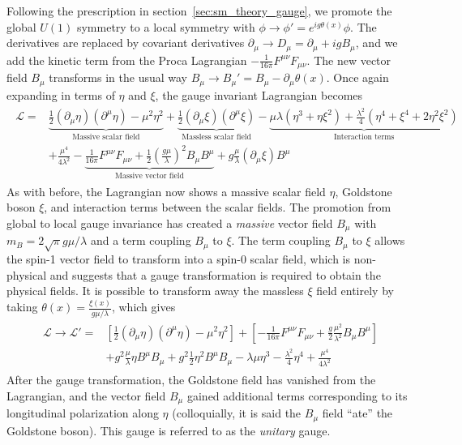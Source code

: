 Following the prescription in section~\ref{sec:sm_theory_gauge}, we promote the global $U(1)$ symmetry to a local symmetry with $\phi\to\phi'=e^{ig\theta(x)}\phi$. The derivatives are replaced by covariant derivatives $\partial_\mu\to D_\mu=\partial_\mu+igB_\mu$, and we add the kinetic term from the Proca Lagrangian $-\frac{1}{16\pi}F^{\mu\nu}F_{\mu\nu}$. The new vector field $B_\mu$ transforms in the usual way $B_\mu\to B_\mu'=B_\mu-\partial_\mu\theta(x)$. Once again expanding in terms of $\eta$ and $\xi$, the gauge invariant Lagrangian becomes
\begin{align}
	\begin{split}
	\mathcal{L}=&\underbrace{\frac{1}{2}(\partial_\mu\eta)(\partial^\mu\eta)-\mu^2\eta^2}_\text{Massive scalar field}+\underbrace{\frac{1}{2}(\partial_\mu\xi)(\partial^\mu\xi)}_\text{Massless scalar field}-\underbrace{\mu\lambda(\eta^3+\eta\xi^2)+\frac{\lambda^2}{4}(\eta^4+\xi^4+2\eta^2\xi^2)}_\text{Interaction terms}\\
	&+\frac{\mu^4}{4\lambda^2}-\underbrace{\frac{1}{16\pi}F^{\mu\nu}F_{\mu\nu}+\frac{1}{2}\left(\frac{g\mu}{\lambda}\right)^2B_\mu B^\mu}_\text{Massive vector field}+g\frac{\mu}{\lambda}(\partial_\mu\xi)B^\mu
	\end{split}
\end{align}
As with before, the Lagrangian now shows a massive scalar field $\eta$, Goldstone boson $\xi$, and interaction terms between the scalar fields. The promotion from global to local gauge invariance has created a \textit{massive} vector field $B_\mu$ with $m_B=2\sqrt{\pi}g\mu/\lambda$ and a term coupling $B_\mu$ to $\xi$. The term coupling $B_\mu$ to $\xi$ allows the spin-1 vector field to transform into a spin-0 scalar field, which is non-physical and suggests that a gauge transformation is required to obtain the physical fields. It is possible to transform away the massless $\xi$ field entirely by taking $\theta(x)=\frac{\xi(x)}{g\mu/\lambda}$, which gives
\begin{align}
	\begin{split}
		\mathcal{L}\to\mathcal{L'}=&\left[\frac{1}{2}(\partial_\mu\eta)(\partial^\mu\eta)-\mu^2\eta^2\right]+\left[-\frac{1}{16\pi}F^{\mu\nu}F_{\mu\nu}+\frac{g}{2}\frac{\mu^2}{\lambda^2}B_\mu B^\mu\right]\\
		&+g^2\frac{\mu}{\lambda}\eta B^\mu B_\mu+g^2\frac{1}{2}\eta^2B^\mu B_\mu-\lambda\mu\eta^3-\frac{\lambda^2}{4}\eta^4+\frac{\mu^4}{4\lambda^2}
	\end{split}
\end{align}
After the gauge transformation, the Goldstone field has vanished from the Lagrangian, and the vector field $B_\mu$ gained additional terms corresponding to its longitudinal polarization along $\eta$ (colloquially, it is said the $B_\mu$ field ``ate'' the Goldstone boson). This gauge is referred to as the \textit{unitary} gauge.

